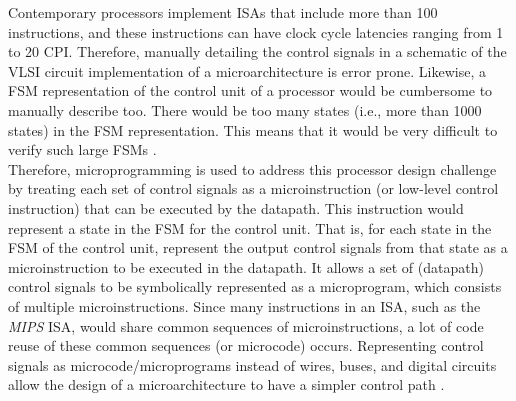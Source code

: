 Contemporary processors implement ISAs that include more than 100 instructions, and these instructions can have clock cycle latencies ranging from 1 to 20 CPI. Therefore, manually detailing the control signals in a schematic of the VLSI circuit implementation of a microarchitecture is error prone. Likewise, a FSM representation of the control unit of a processor would be cumbersome to manually describe too. There would be too many states (i.e., more than 1000 states) in the FSM representation. This means that it would be very difficult to verify such large FSMs \cite{Patterson2005a}. \\

Therefore, microprogramming is used to address this processor design challenge by treating each set of control signals as a microinstruction (or low-level control instruction) that can be executed by the datapath. This instruction would represent a state in the FSM for the control unit. That is, for each state in the FSM of the control unit, represent the output control signals from that state as a microinstruction to be executed in the datapath. It allows a set of (datapath) control signals to be symbolically represented as a microprogram, which consists of multiple microinstructions. Since many instructions in an ISA, such as the {\it MIPS} ISA, would share common sequences of microinstructions, a lot of code reuse of these common sequences (or microcode) occurs. Representing control signals as microcode/microprograms instead of wires, buses, and digital circuits allow the design of a microarchitecture to have a simpler control path \cite{Patterson2005a}. \\



















